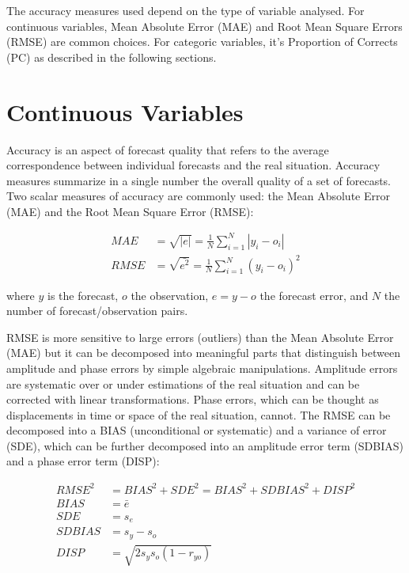 The accuracy measures used depend on the type of variable analysed. For continuous variables, Mean Absolute Error (MAE) and Root Mean Square Errors (RMSE) are common choices. For categoric variables, it's Proportion of Corrects (PC) as described in the following sections.

\section{Continuous Variables}
\label{sec:verif_cont}

Accuracy is an aspect of forecast quality that refers to the average correspondence between individual forecasts and the real situation. Accuracy measures summarize in a single number the overall quality of a set of forecasts. Two scalar measures of accuracy are commonly used: the Mean Absolute Error (MAE) and the Root Mean Square Error (RMSE):

\begin{align}
    MAE &= \sqrt{|e|} = \frac{1}{N} \sum_{i=1}^N |y_i - o_i| \\
    RMSE &= \sqrt{\bar{e^2}} = \frac{1}{N} \sum_{i=1}^N (y_i - o_i)^2
\end{align}

where $y$ is the forecast, $o$ the observation, $e = y - o$ the forecast error, and $N$ the number of forecast/observation pairs. 

RMSE is more sensitive to large errors (outliers) than the Mean Absolute Error (MAE) but it can be decomposed into meaningful parts that distinguish between amplitude and phase errors by simple algebraic manipulations. Amplitude errors are systematic over or under estimations of the real situation and can be corrected with linear transformations. Phase errors, which can be thought as displacements in time or space of the real situation, cannot. The RMSE can be decomposed into a BIAS (unconditional or systematic) and a variance of error (SDE), which can be further decomposed into an amplitude error term (SDBIAS) and a phase error term (DISP):

\begin{align}
    RMSE^2 & = BIAS^2 + SDE^2 = BIAS^2 + SDBIAS^2 + DISP^2 \\
    BIAS & = \bar{e} \\
    SDE & = s_e \\
    SDBIAS & = s_y - s_o \\
    DISP & = \sqrt{2 s_y s_o (1-r_{yo})} 
\end{align}

